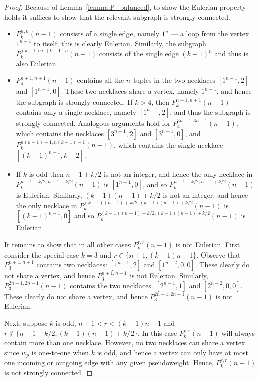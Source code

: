 \documentclass[10pt,a4paper]{amsart}
\begin{document}
\begin{proof}
Because of Lemma~\ref{lemma:P_balanced}, to show the Eulerian property holds it suffices to show
that the relevant subgraph is strongly connected.
\begin{itemize}
\item[(i)] $P_k^{n,n}(n-1)$ consists of a single edge, namely $1^n$ --- a loop from the vertex
    $1^{n-1}$ to itself; this is clearly Eulerian.  Similarly, the subgraph
    $P_k^{(k-1)n,(k-1)n}(n-1)$ consists of the single edge $(k-1)^n$ and thus is also Eulerian.
\item[(ii)] $P_4^{n+1,n+1}(n-1)$ contains all the $n$-tuples in the two necklaces $[1^{n-1},2]$
    and $[1^{n-1},0]$.  These two necklaces share a vertex, namely $1^{n-1}$, and hence the
    subgraph is strongly connected. If $k>4$, then $P_k^{n+1,n+1}(n-1)$ contains only a single
    necklace, namely $[1^{n-1},2]$, and thus the subgraph is strongly connected.  Analogous
    arguments hold for $P_4^{3n-1,3n-1}(n-1)$, which contains the necklaces $[3^{n-1},2]$ and
    $[3^{n-1},0]$, and $P_k^{n(k-1)-1,n(k-1)-1}(n-1)$, which contains the single necklace
    $[(k-1)^{n-1},k-2]$.
\item[(iii)] If $k$ is odd then $n-1+k/2$ is not an integer, and hence the only necklace in
    $P_k^{n-1+k/2,n-1+k/2}(n-1)$ is $[1^{n-1},0]$, and so $P_k^{n-1+k/2,n-1+k/2}(n-1)$ is
    Eulerian.  Similarly, $(k-1)(n-1)+k/2$ is not an integer, and hence the only necklace in
    $P_k^{(k-1)(n-1)+k/2,(k-1)(n-1)+k/2}(n-1)$ is $[(k-1)^{n-1},0]$ and so
    $P_k^{(k-1)(n-1)+k/2,(k-1)(n-1)+k/2}(n-1)$ is Eulerian.
\end{itemize}
It remains to show that in all other cases $P_k^{r,r}(n-1)$ is not Eulerian. First consider the
special case $k=3$ and $r\in\{n+1,(k-1)n-1\}$. Observe that $P_3^{n+1,n+1}$ contains two necklaces:
$[1^{n-1},2]$ and $[1^{n-2},0,0]$. These clearly do not share a vertex, and hence $P_3^{n+1,n+1}$
is not Eulerian.  Similarly, $P_3^{2n-1,2n-1}(n-1)$ contains the two necklaces. $[2^{n-1},1]$ and
$[2^{n-2},0,0]$. These clearly do not share a vertex, and hence $P_3^{2n-1,2n-1}(n-1)$ is not
Eulerian.

Next, suppose $k$ is odd, $n+1<r<(k-1)n-1$ and $r\notin\{n-1+k/2,(k-1)(n-1)+k/2\}$.  In this case
$P_k^{r,r}(n-1)$ will always contain more than one necklace. However, no two necklaces can share a
vertex since $w_p$ is one-to-one when $k$ is odd, and hence a vertex can only have at most one
incoming or outgoing edge with any given pseudoweight.  Hence, $P_k^{r,r}(n-1)$ is not strongly
connected.


\end{proof}
\end{document}
